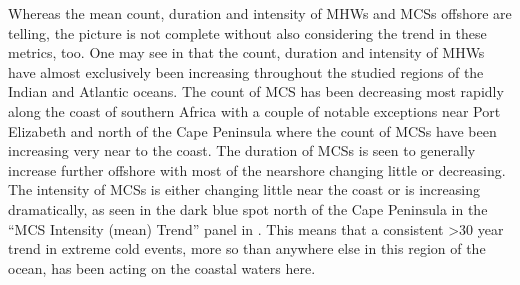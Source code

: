 \documentclass[a4paper,10pt,review]{elsarticle}
\begin{document}
Whereas the mean count, duration and intensity of MHWs and MCSs offshore are telling, the picture is not complete without also considering the trend in these metrics, too. One may see in  that the count, duration and intensity of MHWs have almost exclusively been increasing throughout the studied regions of the Indian and Atlantic oceans. The count of MCS has been decreasing most rapidly along the coast of southern Africa with a couple of notable exceptions near Port Elizabeth and north of the Cape Peninsula where the count of MCSs have been increasing very near to the coast. The duration of MCSs is seen to generally increase further offshore with most of the nearshore changing little or decreasing. The intensity of MCSs is either changing little near the coast or is increasing dramatically, as seen in the dark blue spot north of the Cape Peninsula in the ``MCS Intensity (mean) Trend'' panel in . This means that a consistent >30 year trend in extreme cold events, more so than anywhere else in this region of the ocean, has been acting on the coastal waters here. 

\end{document}
